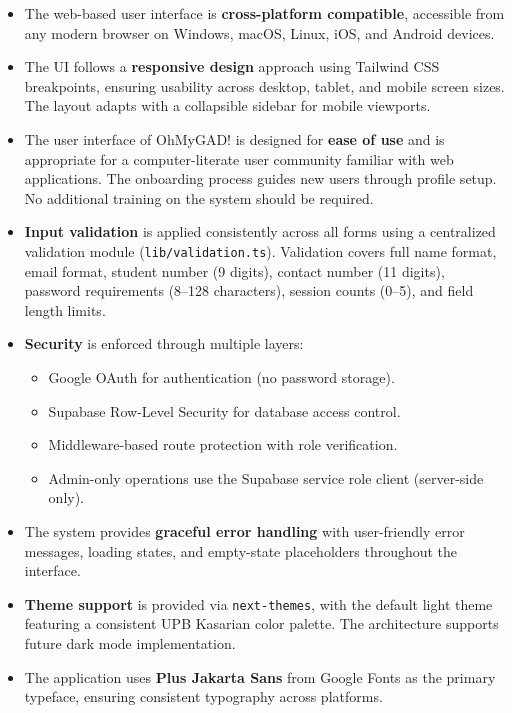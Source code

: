 \documentclass[11pt,a4paper]{article}
\begin{document}
\begin{itemize}[leftmargin=1.5em]
  \item The web-based user interface is \textbf{cross-platform compatible}, accessible from any modern browser on Windows, macOS, Linux, iOS, and Android devices.

  \item The UI follows a \textbf{responsive design} approach using Tailwind CSS breakpoints, ensuring usability across desktop, tablet, and mobile screen sizes. The layout adapts with a collapsible sidebar for mobile viewports.

  \item The user interface of OhMyGAD! is designed for \textbf{ease of use} and is appropriate for a computer-literate user community familiar with web applications. The onboarding process guides new users through profile setup. No additional training on the system should be required.

  \item \textbf{Input validation} is applied consistently across all forms using a centralized validation module (\texttt{lib/validation.ts}). Validation covers full name format, email format, student number (9 digits), contact number (11 digits), password requirements (8--128 characters), session counts (0--5), and field length limits.

  \item \textbf{Security} is enforced through multiple layers:
    \begin{itemize}
      \item Google OAuth for authentication (no password storage).
      \item Supabase Row-Level Security for database access control.
      \item Middleware-based route protection with role verification.
      \item Admin-only operations use the Supabase service role client (server-side only).
    \end{itemize}

  \item The system provides \textbf{graceful error handling} with user-friendly error messages, loading states, and empty-state placeholders throughout the interface.

  \item \textbf{Theme support} is provided via \texttt{next-themes}, with the default light theme featuring a consistent UPB Kasarian color palette. The architecture supports future dark mode implementation.

  \item The application uses \textbf{Plus Jakarta Sans} from Google Fonts as the primary typeface, ensuring consistent typography across platforms.
\end{itemize}
\end{document}
